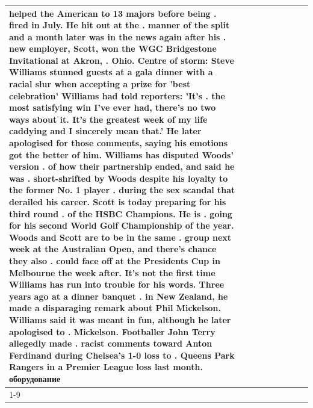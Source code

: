 \begin{table}[H]
\begin{tabular}{lllrlllll}
helped the American to 13 majors before being . fired in July. He hit out at the . manner of the split and a month later was in the news again after his . new employer, Scott, won the WGC Bridgestone Invitational at Akron, . Ohio. Centre of storm: Steve Williams stunned guests at a gala dinner with a racial slur when accepting a prize for 'best celebration' Williams had told reporters: 'It's . the most satisfying win I've ever had, there's no two ways about it. It's the greatest week of my life caddying and I sincerely mean that.' He later apologised for those comments, saying his emotions got the better of him. Williams has disputed Woods' version . of how their partnership ended, and said he was . short-shrifted by Woods despite his loyalty to the former No. 1 player . during the sex scandal that derailed his career. Scott is today preparing for his third round . of the HSBC Champions. He is . going for his second World Golf Championship of the year. Woods and Scott are to be in the same . group next week at the Australian Open, and there's chance they also . could face off at the Presidents Cup in Melbourne the week after. It's not the first time Williams has run into trouble for his words. Three years ago at a dinner banquet . in New Zealand, he made a disparaging remark about Phil Mickelson. Williams said it was meant in fun, although he later apologised to . Mickelson. Footballer John Terry allegedly made . racist comments toward Anton Ferdinand during Chelsea's 1-0 loss to . Queens Park Rangers in a Premier League loss last month. оборудование \\
\cline{1-9}

\end{tabular}
\end{table}

